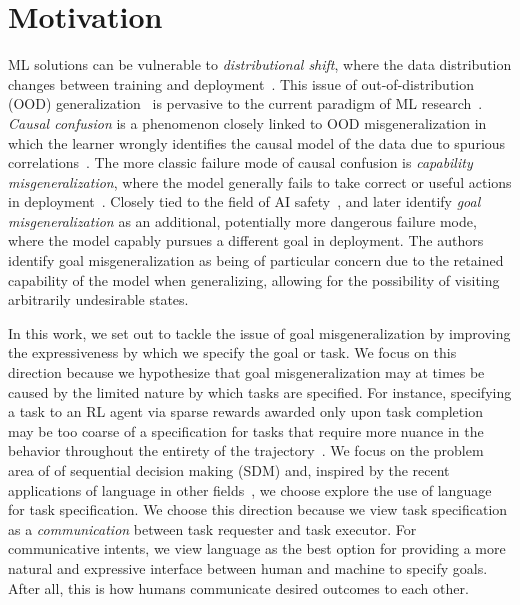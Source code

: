 \documentclass[../main.tex]{subfiles}
\begin{document}
\section{Motivation}

ML solutions can be vulnerable to \textit{distributional shift},
where the data distribution changes between training and
deployment~\citep{quinonero-candela_dataset_2008}. This issue of out-of-distribution (OOD)
generalization~\citep{shen_towards_2021} is pervasive to the current paradigm of ML
research~\citep{arjovsky_out_2020}. \textit{Causal confusion} is a phenomenon closely linked to OOD misgeneralization in which the learner wrongly identifies the causal
model of the data due to spurious correlations~\citep{de_haan_causal_2019}. The more classic failure
mode of causal confusion is \textit{capability misgeneralization}, where the model generally fails
to take correct or useful actions in deployment~\citep{gupta_can_2022, tien_study_2022}. Closely
tied to the field of AI safety~\citep{hendrycks_unsolved_2022, ngo_alignment_2022,
	hendrycks_overview_2023}, \citet{langosco_goal_2022} and later \citet{shah_goal_2022} identify
\textit{goal misgeneralization} as an additional, potentially more dangerous failure mode, where the
model capably pursues a different goal in deployment. The authors identify goal misgeneralization as
being of particular concern due to the retained capability of the model when generalizing, allowing
for the possibility of visiting arbitrarily undesirable states.

In this work, we set out to tackle the issue of goal misgeneralization by improving the
expressiveness by which we specify the goal or task. We focus on this direction because we
hypothesize that goal misgeneralization may at times be caused by the limited nature by which tasks
are specified. For instance, specifying a task to an RL agent via sparse rewards awarded only upon
task completion may be too coarse of a specification for tasks that require more nuance in the
behavior throughout the entirety of the trajectory~\citep{vamplew_scalar_2022}. We focus on the
problem area of of sequential decision making (SDM) and, inspired by the recent applications of
language in other fields~\citep{dosovitskiy_image_2022, ramesh_hierarchical_2022,
	rombach_high-resolution_2022}, we choose explore the use of language for task specification. We
choose this direction because we view task specification as a \emph{communication} between task
requester and task executor. For communicative intents, we view language as the best option for
providing a more natural and expressive interface between human and machine to specify goals. After
all, this is how humans communicate desired outcomes to each other.
\end{document}
